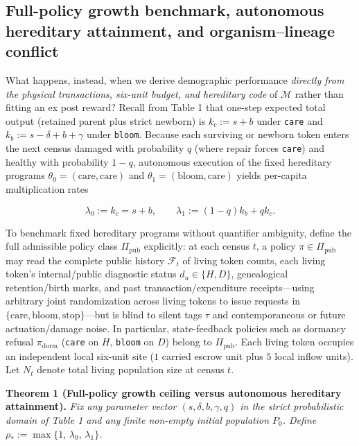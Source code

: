 \documentclass[11pt,a4paper]{article}
\begin{document}
\subsection{Full-policy growth benchmark, autonomous hereditary
attainment, and organism--lineage
conflict}\label{full-policy-growth-benchmark-autonomous-hereditary-attainment-and-organismlineage-conflict}

What happens, instead, when we derive demographic performance
\emph{directly from the physical transactions, six-unit budget, and
hereditary code} of \(\mathcal{M}\) rather than fitting an ex post
reward? Recall from Table 1 that one-step expected total output
(retained parent plus strict newborn) is \(k_c := s + b\) under
\texttt{care} and \(k_b := s - \delta + b + \gamma\) under
\texttt{bloom}. Because each surviving or newborn token enters the next
census damaged with probability \(q\) (where repair forces
\texttt{care}) and healthy with probability \(1-q\), autonomous
execution of the fixed hereditary programs
\(\theta_0 = (\mathrm{care},\mathrm{care})\) and
\(\theta_1 = (\mathrm{bloom},\mathrm{care})\) yields per-capita
multiplication rates

\[\lambda_0 := k_c = s + b, \qquad \lambda_1 := (1 - q) k_b + q k_c.\]

To benchmark fixed hereditary programs without quantifier ambiguity,
define the full admissible policy class \(\Pi_{\mathrm{pub}}\)
explicitly: at each census \(t\), a policy
\(\pi \in \Pi_{\mathrm{pub}}\) may read the complete public history
\(\mathcal{F}_t\) of living token counts, each living token's
internal/public diagnostic status \(d_u \in \{H, D\}\), genealogical
retention/birth marks, and past transaction/expenditure receipts---using
arbitrary joint randomization across living tokens to issue requests in
\(\{\mathrm{care}, \mathrm{bloom}, \mathrm{stop}\}\)---but is blind to
silent tags \(\tau\) and contemporaneous or future actuation/damage
noise. In particular, state-feedback policies such as dormancy refusal
\(\pi_{\mathrm{dorm}}\) (\texttt{care} on \(H\), \texttt{bloom} on
\(D\)) belong to \(\Pi_{\mathrm{pub}}\). Each living token occupies an
independent local six-unit site (\(1\) carried escrow unit plus \(5\)
local inflow units). Let \(N_t\) denote total living population size at
census \(t\).

\textbf{Theorem 1 (Full-policy growth ceiling versus autonomous
hereditary attainment).} \emph{Fix any parameter vector
\((s,\delta,b,\gamma,q)\) in the strict probabilistic domain of Table 1
and any finite non-empty initial population \(P_0\). Define
\(\rho_* := \max\{1,\, \lambda_0,\, \lambda_1\}\).}
\end{document}
